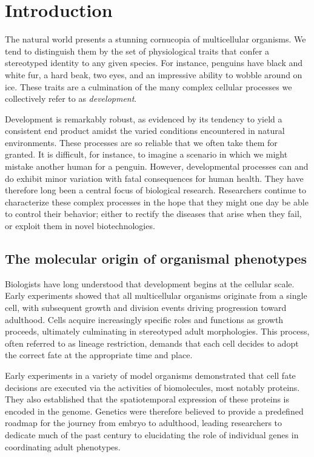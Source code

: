 \chapter{Introduction}

The natural world presents a stunning cornucopia of multicellular organisms. We tend to distinguish them by the set of physiological traits that confer a stereotyped identity to any given species. For instance, penguins have black and white fur, a hard beak, two eyes, and an impressive ability to wobble around on ice. These traits are a culmination of the many complex cellular processes we collectively refer to as \emph{development}.

Development is remarkably robust, as evidenced by its tendency to yield a consistent end product amidst the varied conditions encountered in natural environments. These processes are so reliable that we often take them for granted. It is difficult, for instance, to imagine a scenario in which we might mistake another human for a penguin. However, developmental processes can and do exhibit minor variation with fatal consequences for human health. They have therefore long been a central focus of biological research. Researchers continue to characterize these complex processes in the hope that they might one day be able to control their behavior; either to rectify the diseases that arise when they fail, or exploit them in novel biotechnologies.

\section{The molecular origin of organismal phenotypes}

Biologists have long understood that development begins at the cellular scale. Early experiments showed that all multicellular organisms originate from a single cell, with subsequent growth and division events driving progression toward adulthood. Cells acquire increasingly specific roles and functions as growth proceeds, ultimately culminating in stereotyped adult morphologies. This process, often referred to as lineage restriction, demands that each cell decides to adopt the correct fate at the appropriate time and place.

Early experiments in a variety of model organisms demonstrated that cell fate decisions are executed via the activities of biomolecules, most notably proteins. They also established that the spatiotemporal expression of these proteins is encoded in the genome. Genetics were therefore believed to provide a predefined roadmap for the journey from embryo to adulthood, leading researchers to dedicate much of the past century to elucidating the role of individual genes in coordinating adult phenotypes.

